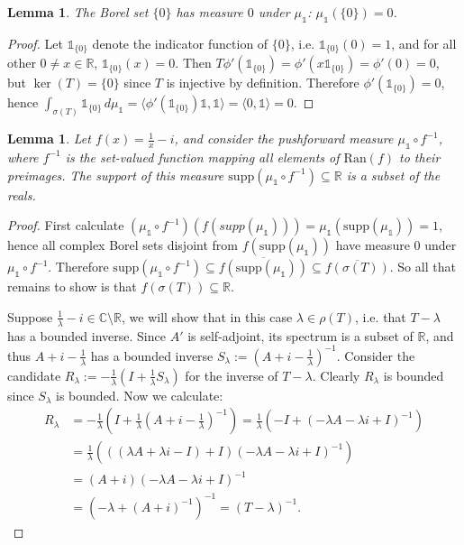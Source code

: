 \documentclass[12pt,oneside]{report}
\newtheorem{lem}[thm]{Lemma}
\begin{document}
\begin{lem}
    The Borel set $\{ 0 \}$ has measure $0$ under $\mu_{\mathds{1}}$: $\mu_{\mathds{1}}(\{ 0 \}) = 0$.
\end{lem}
\begin{proof}
    Let $\mathds{1}_{\{ 0 \}}$ denote the indicator function of $\{ 0 \}$, i.e. $\mathds{1}_{\{ 0 \}}(0) = 1$, and for all other $0 \neq x \in \mathbb{R}$, $\mathds{1}_{\{ 0 \}}(x) = 0$. Then $T\phi'(\mathds{1}_{\{ 0 \}}) = \phi'(x\mathds{1}_{\{ 0 \}}) = \phi'(0) = 0$, but $\ker(T) = \{ 0 \}$ since $T$ is injective by definition. Therefore $\phi'(\mathds{1}_{\{ 0 \}}) = 0$, hence $\int _{\sigma(T)} \mathds{1}_{\{ 0 \}} \, d\mu_{\mathds{1}} = \langle \phi'(\mathds{1}_{\{ 0 \}})\mathds{1}, \mathds{1} \rangle = \langle 0 , \mathds{1} \rangle = 0$.
\end{proof}

\begin{lem}\label{supp-real}
    Let $f(x) = \frac{1}{x} - i$, and consider the pushforward measure $\mu_{\mathds{1}} \circ f^{-1}$, where $f^{-1}$ is the set-valued function mapping all elements of $\mathrm{Ran}(f)$ to their preimages. The support of this measure $\mathrm{supp}(\mu_{\mathds{1}} \circ f^{-1}) \subseteq \mathbb{R}$ is a subset of the reals.
\end{lem}
\begin{proof}
    First calculate $(\mu_{\mathds{1}} \circ f^{-1})(f(supp(\mu_{\mathds{1}}))) = \mu_{\mathds{1}}(\mathrm{supp}(\mu_{\mathds{1}})) = 1$, hence all complex Borel sets disjoint from $f(\mathrm{supp}(\mu_{\mathds{1}}))$ have measure $0$ under $\mu_{\mathds{1}} \circ f^{-1}$. Therefore $\mathrm{supp}(\mu_{\mathds{1}} \circ f^{-1}) \subseteq \overline{f(\mathrm{supp}(\mu_{\mathds{1}}))} \subseteq \overline{f(\sigma(T))}$. So all that remains to show is that $f(\sigma(T)) \subseteq \mathbb{R}$.

    Suppose $\frac{1}{\lambda} - i \in \mathbb{C} \setminus \mathbb{R}$, we will show that in this case $\lambda \in \rho(T)$, i.e. that $T - \lambda$ has a bounded inverse. Since $A'$ is self-adjoint, its spectrum is a subset of $\mathbb{R}$, and thus $A + i - \frac{1}{\lambda}$ has a bounded inverse $S_{\lambda} := \left( A + i - \frac{1}{\lambda} \right)^{-1}$. Consider the candidate $R_{\lambda} := -\frac{1}{\lambda}\left( I + \frac{1}{\lambda} S_{\lambda} \right)$ for the inverse of $T - \lambda$. Clearly $R_{\lambda}$ is bounded since $S_{\lambda}$ is bounded. Now we calculate:
    \begin{align*}
        R_{\lambda} &= -\frac{1}{\lambda}\left( I + \frac{1}{\lambda} \left( A + i - \frac{1}{\lambda} \right)^{-1} \right) = \frac{1}{\lambda}\left( - I + \left( - \lambda A - \lambda i + I \right)^{-1} \right) \\
        &= \frac{1}{\lambda}\left( ( \left( \lambda A + \lambda i - I \right) + I) \left( - \lambda A - \lambda i + I \right)^{-1} \right) \\
        &= (A + i)\left( - \lambda A - \lambda i + I \right)^{-1} \\
        &= (- \lambda + (A + i)^{-1})^{-1} = (T - \lambda)^{-1}.
    \end{align*}
\end{proof}
\end{document}
